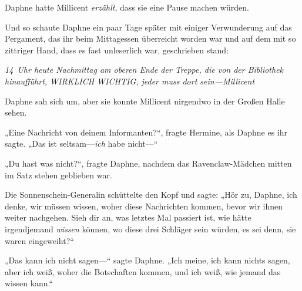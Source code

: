Daphne hatte Millicent \emph{erzählt}, dass sie eine Pause machen würden.

Und so schaute Daphne ein paar Tage später mit einiger Verwunderung auf das Pergament, das ihr beim Mittagessen überreicht worden war und auf dem mit so zittriger Hand, dass es fast unleserlich war, geschrieben stand:

\emph{14~Uhr heute Nachmittag am oberen Ende der Treppe, die von der Bibliothek hinaufführt, WIRKLICH WICHTIG, jeder muss dort sein—Millicent}

Daphne sah sich um, aber sie konnte Millicent nirgendwo in der Großen Halle sehen.

„Eine Nachricht von deinem Informanten?“, fragte Hermine, als Daphne es ihr sagte.
„Das ist seltsam—\emph{ich} habe nicht—“

„Du hast was nicht?“, fragte Daphne, nachdem das Ravenclaw-Mädchen mitten im Satz stehen geblieben war.

Die Sonnenschein-Generalin schüttelte den Kopf und sagte:
„Hör zu, Daphne, ich denke, wir müssen wissen, woher diese Nachrichten kommen, bevor wir ihnen weiter nachgehen. Sieh dir an, was letztes Mal passiert ist, wie hätte irgendjemand \emph{wissen} können, wo diese drei Schläger sein würden, es sei denn, sie waren eingeweiht?“

„Das kann ich nicht sagen—“ sagte Daphne.
„Ich meine, ich kann nichts sagen, aber ich weiß, woher die Botschaften kommen, und ich weiß, wie jemand das wissen kann.“


